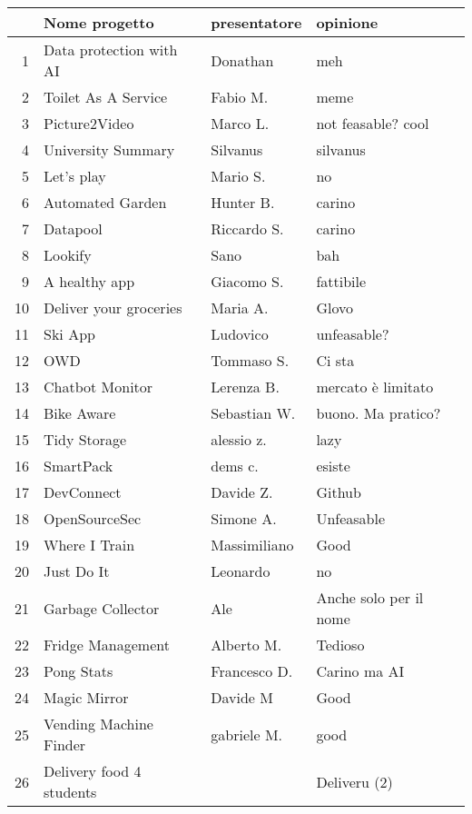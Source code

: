 \documentclass{article}
\begin{document}
\begin{tabular}{r|l l l|}
      & Nome progetto & presentatore & opinione \\ \hline
    1& Data protection with AI & Donathan & meh  \\ \hline
    2& Toilet As A Service & Fabio M. & meme \\ \hline
    3& Picture2Video & Marco L. & not feasable? cool \\ \hline
    4& University Summary & Silvanus & silvanus \\ \hline
    5& Let's play & Mario S. & no \\ \hline
    6& Automated Garden & Hunter B. & carino \\ \hline
    7& Datapool &  Riccardo S. & carino \\ \hline
    8& Lookify & Sano & bah \\ \hline
    9& A healthy app & Giacomo S. & fattibile \\ \hline
    10& Deliver your groceries & Maria A. & Glovo \\ \hline
    11& Ski App & Ludovico & unfeasable? \\ \hline
    12& OWD & Tommaso S. & Ci sta \\ \hline
    13& Chatbot Monitor & Lerenza B. & mercato è limitato \\ \hline
    14& Bike Aware & Sebastian W. & buono. Ma pratico? \\ \hline
    15& Tidy Storage & alessio z. & lazy \\ \hline
    16& SmartPack & dems c. & esiste \\ \hline
    17& DevConnect & Davide Z. & Github \\ \hline
    18& OpenSourceSec& Simone A. & Unfeasable \\ \hline
    19& Where I Train & Massimiliano & Good \\ \hline
    20& Just Do It & Leonardo & no \\ \hline
    21& Garbage Collector & Ale & Anche solo per il nome \\ \hline
    22& Fridge Management & Alberto M. & Tedioso \\ \hline
    23& Pong Stats & Francesco D. & Carino ma AI \\ \hline
    24& Magic Mirror & Davide M & Good \\ \hline
    25& Vending Machine Finder & gabriele M. & good \\ \hline
    26& Delivery food 4 students &  & Deliveru (2) \\ \hline

\end{tabular}
\end{document}
